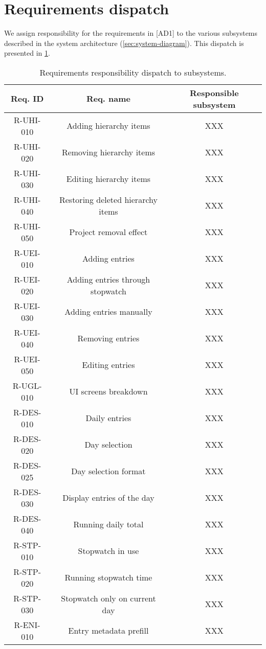 \section{Requirements dispatch}
We assign responsibility for the requirements in [AD1] to the various subsystems
described in the system architecture (\cref{sec:system-diagram}). This dispatch
is presented in \cref{tab:req-dispatch}.

\begin{longtable}{| c | c | c |}
  \caption{\label{tab:req-dispatch} Requirements responsibility dispatch to
    subsystems.} \\ \hline
  \textbf{Req. ID} & \textbf{Req. name} & \textbf{Responsible subsystem} \\ \hline
  R-UHI-010 & Adding hierarchy items & XXX \\ \hline
  R-UHI-020 & Removing hierarchy items & XXX \\ \hline
  R-UHI-030 & Editing hierarchy items & XXX \\ \hline
  R-UHI-040 & Restoring deleted hierarchy items & XXX \\ \hline
  R-UHI-050 & Project removal effect & XXX \\ \hline
  R-UEI-010 & Adding entries & XXX \\ \hline
  R-UEI-020 & Adding entries through stopwatch & XXX \\ \hline
  R-UEI-030 & Adding entries manually & XXX \\ \hline
  R-UEI-040 & Removing entries & XXX \\ \hline
  R-UEI-050 & Editing entries & XXX \\ \hline
  R-UGL-010 & UI screens breakdown & XXX \\ \hline
  R-DES-010 & Daily entries & XXX \\ \hline
  R-DES-020 & Day selection & XXX \\ \hline
  R-DES-025 & Day selection format & XXX \\ \hline
  R-DES-030 & Display entries of the day & XXX \\ \hline
  R-DES-040 & Running daily total & XXX \\ \hline
  R-STP-010 & Stopwatch in use & XXX \\ \hline
  R-STP-020 & Running stopwatch time & XXX \\ \hline
  R-STP-030 & Stopwatch only on current day & XXX \\ \hline
  R-ENI-010 & Entry metadata prefill & XXX \\ \hline

\end{longtable}
